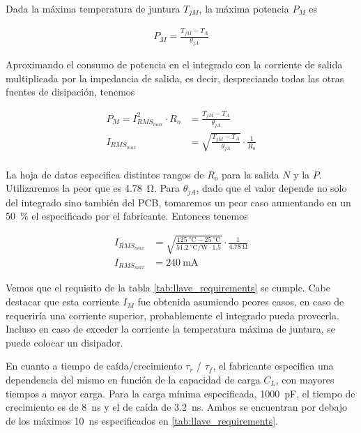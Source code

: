 Dada la máxima temperatura de juntura $T_{jM}$, la máxima potencia $P_M$ es

\begin{equation}
    \begin{aligned}
        P_{M} = \frac{T_{jM}-T_A}{\theta_{jA}}
    \end{aligned}
\end{equation}

Aproximando el consumo de potencia en el integrado con la corriente de salida
multiplicada por la impedancia de salida, es decir, despreciando todas las otras
fuentes de disipación, tenemos

\begin{equation}
    \begin{aligned}
        P_{M} = I_{RMS_{max}}^2 \cdot R_o &= \frac{T_{jM}-T_A}{\theta_{jA}} \\
        I_{RMS_{max}} &= \sqrt{\frac{T_{jM}-T_A}{\theta_{jA}}} \cdot \frac{1}{R_o} \\
    \end{aligned}
\end{equation}

La hoja de datos especifica distintos rangos de $R_o$ para la salida $N$ y la
$P$. Utilizaremos la peor que es \qty{4.78}{\ohm}. Para $\theta_{jA}$, dado que
el valor depende no solo del integrado sino también del PCB, tomaremos un peor
caso aumentando en un \qty{50}{\percent} el especificado por el fabricante.
Entonces tenemos

\begin{equation}
    \begin{aligned}
        I_{RMS_{max}} &= \sqrt{\frac{ \qty{125}{\celsius}-
        \qty{25}{\celsius}}{\qty[per-mode=fraction]{51.2}{\celsius\per\watt}
        \cdot 1.5 }} \cdot \frac{1}{ \qty{4.78}{\ohm} } \\
        I_{RMS_{max}} &= \qty{240}{\milli\ampere}
    \end{aligned}
\end{equation}

Vemos que el requisito de la tabla \ref{tab:llave_requirements} se cumple. Cabe
destacar que esta corriente $I_M$ fue obtenida asumiendo peores casos, en caso
de requeriría una corriente superior, probablemente el integrado pueda
proveerla. Incluso en caso de exceder la corriente la temperatura máxima de
juntura, se puede colocar un disipador.

En cuanto a tiempo de caída/crecimiento $\tau_{r}$ / $\tau_{f}$, el fabricante
especifica una dependencia del mismo en función de la capacidad de carga $C_L$,
con mayores tiempos a mayor carga. Para la carga mínima especificada,
\qty{1000}{\pico\farad}, el tiempo de crecimiento es de \qty{8}{\nano\second} y
el de caída de \qty{3.2}{\nano\second}. Ambos se encuentran por debajo de los
máximos \qty{10}{\nano\second} especificados en \ref{tab:llave_requirements}.


